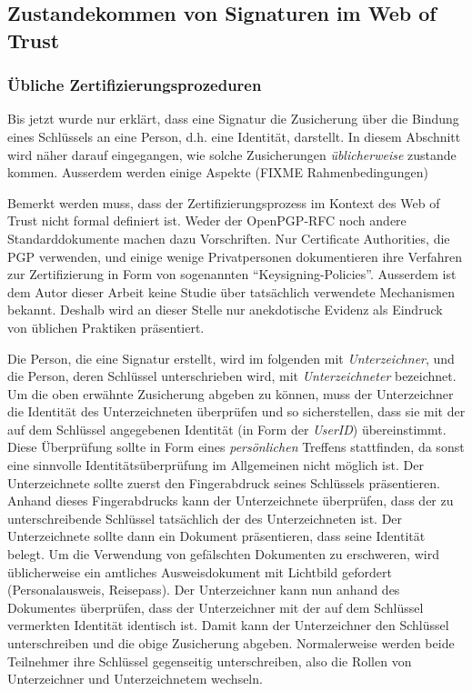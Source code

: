 \subsection{Zustandekommen von Signaturen im Web of Trust}
\label{sec:sozi-komp-des}

\subsubsection{\"Ubliche Zertifizierungsprozeduren}
\label{sec:ubliche-zert}

Bis jetzt wurde nur erkl\"art, dass eine Signatur die
Zusicherung \"uber die Bindung eines Schl\"ussels an eine Person,
d.h. eine Identit\"at, darstellt. In diesem Abschnitt wird n\"aher
darauf eingegangen, wie solche Zusicherungen \emph{\"ublicherweise}
zustande kommen. Ausserdem werden einige Aspekte (FIXME
Rahmenbedingungen)

Bemerkt werden muss, dass der Zertifizierungsprozess im Kontext des
Web of Trust nicht formal definiert ist. Weder der OpenPGP-RFC noch
andere Standarddokumente machen dazu Vorschriften. Nur Certificate
Authorities, die PGP verwenden, und einige wenige Privatpersonen
dokumentieren ihre Verfahren zur Zertifizierung in Form von
sogenannten ``Keysigning-Policies''. Ausserdem ist dem Autor dieser
Arbeit keine Studie \"uber tats\"achlich verwendete Mechanismen
bekannt. Deshalb wird an dieser Stelle nur anekdotische Evidenz
als Eindruck von \"ublichen Praktiken pr\"asentiert.

Die Person, die eine Signatur erstellt, wird im folgenden mit
\emph{Unterzeichner}, und die Person, deren Schl\"ussel
unterschrieben wird, mit \emph{Unterzeichneter} bezeichnet. Um
die oben erw\"ahnte Zusicherung abgeben zu k\"onnen, muss der
Unterzeichner die Identit\"at des Unterzeichneten \"uberpr\"ufen und
so sicherstellen, dass sie mit der auf dem Schl\"ussel angegebenen
Identit\"at (in Form der \emph{UserID}) \"ubereinstimmt. Diese
\"Uberpr\"ufung sollte in Form eines \emph{pers\"onlichen} Treffens
stattfinden, da sonst eine sinnvolle Identit\"ats\"uberpr\"ufung im
Allgemeinen nicht m\"oglich ist. Der Unterzeichnete sollte zuerst den
Fingerabdruck seines Schl\"ussels pr\"asentieren. Anhand dieses
Fingerabdrucks kann der Unterzeichnete \"uberpr\"ufen, dass der zu
unterschreibende Schl\"ussel tats\"achlich der des Unterzeichneten
ist.  Der Unterzeichnete sollte dann ein Dokument pr\"asentieren, dass
seine Identit\"at belegt. Um die Verwendung von gef\"alschten
Dokumenten zu erschweren, wird \"ublicherweise ein amtliches
Ausweisdokument mit Lichtbild gefordert (Personalausweis,
Reisepass). Der Unterzeichner kann nun anhand des Dokumentes
\"uberpr\"ufen, dass der Unterzeichner mit der auf dem Schl\"ussel
vermerkten Identit\"at identisch ist. Damit kann der Unterzeichner den
Schl\"ussel unterschreiben und die obige Zusicherung
abgeben. Normalerweise werden beide Teilnehmer ihre Schl\"ussel
gegenseitig unterschreiben, also die Rollen von Unterzeichner und
Unterzeichnetem wechseln.

